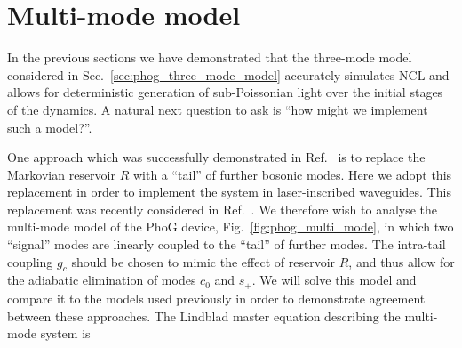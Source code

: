 



\section{Multi-mode model}\label{sec:phog_multi_mode}
In the previous sections we have demonstrated that the three-mode model considered in Sec.~\ref{sec:phog_three_mode_model} accurately simulates NCL and allows for deterministic generation of sub-Poissonian light over the initial stages of the dynamics. A natural next question to ask is ``how might we implement such a model?''. %

One approach which was successfully demonstrated in Ref.~\cite{Mukherjee2017} is to replace the Markovian reservoir $R$ with a ``tail'' of further bosonic modes. %
Here we adopt this replacement in order to implement the system in laser-inscribed waveguides. This replacement was recently considered in Ref.~\cite{Mukherjee2015, Mukherjee2017}. We therefore wish to analyse the multi-mode model of the PhoG device, Fig.~\ref{fig:phog_multi_mode}, in which two ``signal'' modes are linearly coupled to the ``tail'' of further modes. The intra-tail coupling $g_c$ should be chosen to mimic the effect of reservoir $R$, and thus allow for the adiabatic elimination of modes $c_0$ and $s_+$. We will solve this model and compare it to the models used previously in order to demonstrate agreement between these approaches. %
The Lindblad master equation describing the multi-mode system is

